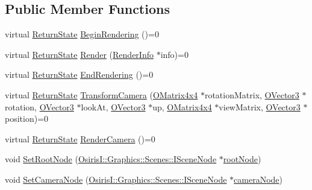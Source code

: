 \subsection*{Public Member Functions}
\begin{DoxyCompactItemize}
\item 
virtual \hyperlink{namespace_osiris_i_a8f53bf938dc75c65c6a529694514013e}{Return\-State} \hyperlink{class_osiris_i_1_1_graphics_1_1_renderer_1_1_i_renderer_a73c2fa9b3d3c9c4b315499f1e647f7c2}{Begin\-Rendering} ()=0
\item 
virtual \hyperlink{namespace_osiris_i_a8f53bf938dc75c65c6a529694514013e}{Return\-State} \hyperlink{class_osiris_i_1_1_graphics_1_1_renderer_1_1_i_renderer_aea5ddc956f9d324f3875847aeebe3a85}{Render} (\hyperlink{struct_osiris_i_1_1_graphics_1_1_renderer_1_1_render_info}{Render\-Info} $\ast$info)=0
\item 
virtual \hyperlink{namespace_osiris_i_a8f53bf938dc75c65c6a529694514013e}{Return\-State} \hyperlink{class_osiris_i_1_1_graphics_1_1_renderer_1_1_i_renderer_aa1815add9e7de56a096c2852b78de351}{End\-Rendering} ()=0
\item 
virtual \hyperlink{namespace_osiris_i_a8f53bf938dc75c65c6a529694514013e}{Return\-State} \hyperlink{class_osiris_i_1_1_graphics_1_1_renderer_1_1_i_renderer_aa423ead00f38c631da7cb9dd847ab344}{Transform\-Camera} (\hyperlink{struct_osiris_i_1_1_o_matrix4x4}{O\-Matrix4x4} $\ast$rotation\-Matrix, \hyperlink{struct_osiris_i_1_1_o_vector3}{O\-Vector3} $\ast$rotation, \hyperlink{struct_osiris_i_1_1_o_vector3}{O\-Vector3} $\ast$look\-At, \hyperlink{struct_osiris_i_1_1_o_vector3}{O\-Vector3} $\ast$up, \hyperlink{struct_osiris_i_1_1_o_matrix4x4}{O\-Matrix4x4} $\ast$view\-Matrix, \hyperlink{struct_osiris_i_1_1_o_vector3}{O\-Vector3} $\ast$position)=0
\item 
virtual \hyperlink{namespace_osiris_i_a8f53bf938dc75c65c6a529694514013e}{Return\-State} \hyperlink{class_osiris_i_1_1_graphics_1_1_renderer_1_1_i_renderer_a80b6e90ce3fe6afb282975b8314911f9}{Render\-Camera} ()=0
\item 
void \hyperlink{class_osiris_i_1_1_graphics_1_1_renderer_1_1_i_renderer_a125f369668d64fdad788b2c09000556b}{Set\-Root\-Node} (\hyperlink{class_osiris_i_1_1_graphics_1_1_scenes_1_1_i_scene_node}{Osiris\-I\-::\-Graphics\-::\-Scenes\-::\-I\-Scene\-Node} $\ast$\hyperlink{class_osiris_i_1_1_graphics_1_1_renderer_1_1_i_renderer_a402abcc0f06b70e7eea0706ac905c846}{root\-Node})
\item 
void \hyperlink{class_osiris_i_1_1_graphics_1_1_renderer_1_1_i_renderer_a1881f836babb0923a58a959bd3cdea84}{Set\-Camera\-Node} (\hyperlink{class_osiris_i_1_1_graphics_1_1_scenes_1_1_i_scene_node}{Osiris\-I\-::\-Graphics\-::\-Scenes\-::\-I\-Scene\-Node} $\ast$\hyperlink{class_osiris_i_1_1_graphics_1_1_renderer_1_1_i_renderer_af2af2a7bd5fb61a0067fc4f3e69b9761}{camera\-Node})

\end{DoxyCompactItemize}
